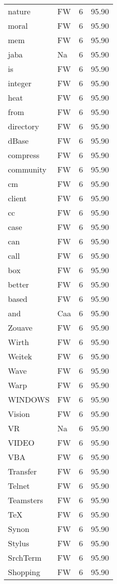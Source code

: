 \documentclass[twocolumn]{book}
\begin{document}
\begin{supertabular}{llrr}
nature & FW & 6 &  95.90\\
moral & FW & 6 &  95.90\\
mem & FW & 6 &  95.90\\
jaba & Na & 6 &  95.90\\
is & FW & 6 &  95.90\\
integer & FW & 6 &  95.90\\
heat & FW & 6 &  95.90\\
from & FW & 6 &  95.90\\
directory & FW & 6 &  95.90\\
dBase & FW & 6 &  95.90\\
compress & FW & 6 &  95.90\\
community & FW & 6 &  95.90\\
cm & FW & 6 &  95.90\\
client & FW & 6 &  95.90\\
cc & FW & 6 &  95.90\\
case & FW & 6 &  95.90\\
can & FW & 6 &  95.90\\
call & FW & 6 &  95.90\\
box & FW & 6 &  95.90\\
better & FW & 6 &  95.90\\
based & FW & 6 &  95.90\\
and & Caa & 6 &  95.90\\
Zouave & FW & 6 &  95.90\\
Wirth & FW & 6 &  95.90\\
Weitek & FW & 6 &  95.90\\
Wave & FW & 6 &  95.90\\
Warp & FW & 6 &  95.90\\
WINDOWS & FW & 6 &  95.90\\
Vision & FW & 6 &  95.90\\
VR & Na & 6 &  95.90\\
VIDEO & FW & 6 &  95.90\\
VBA & FW & 6 &  95.90\\
Transfer & FW & 6 &  95.90\\
Telnet & FW & 6 &  95.90\\
Teamsters & FW & 6 &  95.90\\
TeX & FW & 6 &  95.90\\
Synon & FW & 6 &  95.90\\
Stylus & FW & 6 &  95.90\\
SrchTerm & FW & 6 &  95.90\\
Shopping & FW & 6 &  95.90\\

\end{supertabular}
\end{document}

